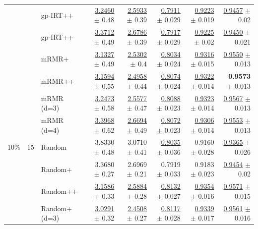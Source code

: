 \begin{longtable}{llp{}rrrrr}
 &  & gp-IRT++ & \underline{3.2460} {\scriptsize $\pm$ 0.48} & \underline{2.5933} {\scriptsize $\pm$ 0.39} & \underline{0.7911} {\scriptsize $\pm$ 0.029} & \underline{0.9223} {\scriptsize $\pm$ 0.019} & \underline{0.9457} {\scriptsize $\pm$ 0.02} \\
 &  & gp-IRT++ & \underline{3.3712} {\scriptsize $\pm$ 0.49} & \underline{2.6786} {\scriptsize $\pm$ 0.39} & \underline{0.7917} {\scriptsize $\pm$ 0.029} & \underline{0.9225} {\scriptsize $\pm$ 0.02} & \underline{0.9450} {\scriptsize $\pm$ 0.021} \\
 &  & mRMR+ & \underline{3.1327} {\scriptsize $\pm$ 0.49} & \underline{2.5302} {\scriptsize $\pm$ 0.4} & \underline{0.8034} {\scriptsize $\pm$ 0.024} & \underline{0.9316} {\scriptsize $\pm$ 0.015} & \underline{0.9550} {\scriptsize $\pm$ 0.013} \\
 &  & mRMR++ & \underline{3.1594} {\scriptsize $\pm$ 0.55} & \underline{2.4958} {\scriptsize $\pm$ 0.44} & \underline{0.8074} {\scriptsize $\pm$ 0.024} & \underline{0.9322} {\scriptsize $\pm$ 0.014} & \textbf{0.9573} {\scriptsize $\pm$ 0.013} \\
 &  & mRMR (d=3) & \underline{3.2473} {\scriptsize $\pm$ 0.58} & \underline{2.5577} {\scriptsize $\pm$ 0.47} & \underline{0.8088} {\scriptsize $\pm$ 0.023} & \underline{0.9323} {\scriptsize $\pm$ 0.014} & \underline{0.9567} {\scriptsize $\pm$ 0.013} \\
 &  & mRMR (d=4) & \underline{3.3968} {\scriptsize $\pm$ 0.62} & \underline{2.6694} {\scriptsize $\pm$ 0.49} & \underline{0.8072} {\scriptsize $\pm$ 0.023} & \underline{0.9306} {\scriptsize $\pm$ 0.014} & \underline{0.9553} {\scriptsize $\pm$ 0.013} \\
\midrule
10\% & 15 & Random & 3.8330 {\scriptsize $\pm$ 0.48} & 3.0710 {\scriptsize $\pm$ 0.41} & \underline{0.8035} {\scriptsize $\pm$ 0.036} & 0.9160 {\scriptsize $\pm$ 0.028} & \underline{0.9365} {\scriptsize $\pm$ 0.026} \\
 &  & Random+ & 3.3680 {\scriptsize $\pm$ 0.27} & 2.6969 {\scriptsize $\pm$ 0.21} & 0.7919 {\scriptsize $\pm$ 0.033} & 0.9183 {\scriptsize $\pm$ 0.023} & \underline{0.9454} {\scriptsize $\pm$ 0.02} \\
 &  & Random++ & \underline{3.1586} {\scriptsize $\pm$ 0.33} & \underline{2.5884} {\scriptsize $\pm$ 0.28} & \underline{0.8132} {\scriptsize $\pm$ 0.027} & \underline{0.9354} {\scriptsize $\pm$ 0.016} & \underline{0.9571} {\scriptsize $\pm$ 0.015} \\
 &  & Random+ (d=3) & \underline{3.0291} {\scriptsize $\pm$ 0.32} & \underline{2.4508} {\scriptsize $\pm$ 0.27} & \underline{0.8117} {\scriptsize $\pm$ 0.028} & \underline{0.9339} {\scriptsize $\pm$ 0.017} & \underline{0.9561} {\scriptsize $\pm$ 0.016} \\

\end{longtable}
